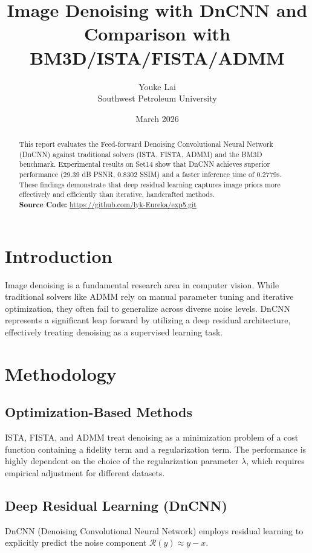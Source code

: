 \documentclass[twocolumn, 10pt]{article}
\title{\textbf{Image Denoising with DnCNN and Comparison with BM3D/ISTA/FISTA/ADMM}}
\author{Youke Lai  \\ Southwest Petroleum University}
\date{March 2026}
\begin{document}
\maketitle

\begin{abstract}
This report evaluates the Feed-forward Denoising Convolutional Neural Network (DnCNN) against traditional solvers (ISTA, FISTA, ADMM) and the BM3D benchmark. Experimental results on Set14 show that DnCNN achieves superior performance (29.39 dB PSNR, 0.8302 SSIM) and a faster inference time of 0.2779s. These findings demonstrate that deep residual learning captures image priors more effectively and efficiently than iterative, handcrafted methods. \\
\textbf{Source Code:} \textcolor{magenta}{\url{https://github.com/lyk-Eureka/exp5.git}}
\end{abstract}

\section{Introduction}
Image denoising is a fundamental research area in computer vision. While traditional solvers like ADMM rely on manual parameter tuning and iterative optimization, they often fail to generalize across diverse noise levels. DnCNN represents a significant leap forward by utilizing a deep residual architecture, effectively treating denoising as a supervised learning task.

\section{Methodology}
\subsection{Optimization-Based Methods}
ISTA, FISTA, and ADMM treat denoising as a minimization problem of a cost function containing a fidelity term and a regularization term. The performance is highly dependent on the choice of the regularization parameter $\lambda$, which requires empirical adjustment for different datasets.

\subsection{Deep Residual Learning (DnCNN)}
DnCNN (Denoising Convolutional Neural Network) employs residual learning to explicitly predict the noise component $\mathcal{R}(y) \approx y - x$. 
\end{document}
